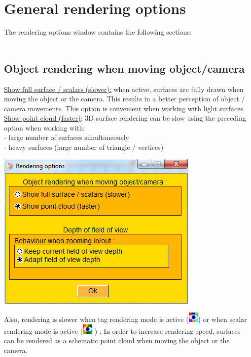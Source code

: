 \section{General rendering options}
The rendering options window contains the following sections:\\\\


\noindent
\begin{minipage}{0.55\textwidth}
\subsection{Object rendering when moving object/camera}
\underline{Show full surface / scalars (slower):}  when active, surfaces are fully drawn when moving the object or the camera. This results in a better perception of object / camera
movements. This option is convenient when working with light surfaces.\\

\noindent
\underline{Show point cloud (faster)}: 3D surface rendering can be slow using the preceding option when working with:\\
- large number of surfaces simultaneously\\
- heavy surfaces (large number of triangle / vertices)\\

\end{minipage}  
 \begin{minipage}{0.45\textwidth}\centering
  \includegraphics[scale=0.4]{images/Viewing_options/Rendering_options.png}

 \end{minipage} 
\noindent
Also, rendering is slower when tag rendering mode is active (\includegraphics[scale=0.7]{images/pixmap/Show_Tag_Window.png}) or when scalar rendering mode is active (\includegraphics[scale=0.7]{images/pixmap/show_color_scale.png} ) . In order to increase rendering speed, surfaces can be rendered as a schematic point cloud when moving the object or the camera.


